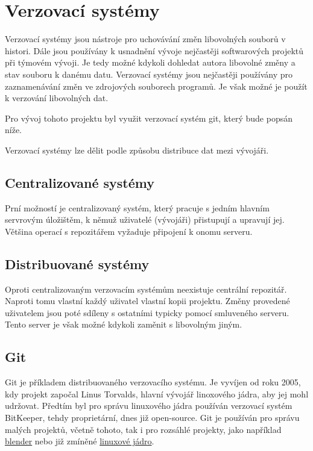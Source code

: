\documentclass[main.tex]{subfiles}
\begin{document}
\section{Verzovací systémy}
Verzovací systémy jsou nástroje pro uchovávání změn libovolných souborů v histori. Dále jsou používány k usnadnění vývoje nejčastěji softwarových projektů při týmovém vývoji. Je tedy možné kdykoli dohledat autora libovolné změny a stav souboru k danému datu. Verzovací systémy jsou nejčastěji používány pro zaznamenávání změn ve zdrojových souborech programů. Je však možné je použít k verzování libovolných dat.

Pro vývoj tohoto projektu byl využit verzovací systém git, který bude popsán níže.

Verzovací systémy lze dělit podle způsobu distribuce dat mezi vývojáři.

\subsection{Centralizované systémy}
Prní možností je centralizovaný systém, který pracuje s jedním hlavním servrovým úložištěm, k němuž uživatelé (vývojáři) přistupují a upravují jej. Většina operací s repozitářem vyžaduje připojení k onomu serveru.

\subsection{Distribuované systémy}
Oproti centralizovaným verzovacím systémům neexistuje centrální repozitář. Naproti tomu vlastní každý uživatel vlastní kopii projektu. Změny provedené uživatelem jsou poté sdíleny s ostatními typicky pomocí smluveného serveru. Tento server je však možné kdykoli zaměnit s libovolným jiným.

\subsection{Git}
Git je příkladem distribuovaného verzovacího systému. Je vyvíjen od roku 2005, kdy projekt započal Linus Torvalds, hlavní vývojář linoxového jádra, aby jej mohl udržovat. Předtím byl pro správu linuxového jádra používán verzovací systém BitKeeper, tehdy proprietární, dnes již open-source. \cite{web:wik:en:git} Git je používán pro správu malých projektů, včetně tohoto, tak i pro rozsáhlé projekty, jako například \href{https://github.com/blender/blender}{blender} nebo již zmíněné \href{https://github.com/torvalds/linux}{linuxové jádro}.
\end{document}

